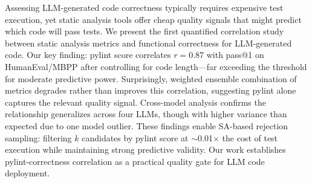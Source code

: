 Assessing LLM-generated code correctness typically requires expensive test execution, yet static analysis tools offer cheap quality signals that might predict which code will pass tests. We present the first quantified correlation study between static analysis metrics and functional correctness for LLM-generated code. Our key finding: pylint score correlates $r=0.87$ with pass@1 on HumanEval/MBPP after controlling for code length---far exceeding the threshold for moderate predictive power. Surprisingly, weighted ensemble combination of metrics degrades rather than improves this correlation, suggesting pylint alone captures the relevant quality signal. Cross-model analysis confirms the relationship generalizes across four LLMs, though with higher variance than expected due to one model outlier. These findings enable SA-based rejection sampling: filtering $k$ candidates by pylint score at $\sim$0.01$\times$ the cost of test execution while maintaining strong predictive validity. Our work establishes pylint-correctness correlation as a practical quality gate for LLM code deployment.
